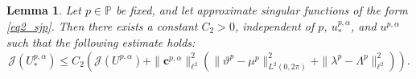 \documentclass[oneside]{article}
\newtheorem{lemma}[theorem]{Lemma}
\begin{document}
{\begin{lemma}\label{Lemma_2_2}
Let \( p \in \mathbb{P} \) be fixed, and let   approximate singular functions of the form \eqref{eq2_sjp}. 
Then there exists a constant \( C_2 > 0 \), independent of \( p \), $u_*^{p, \alpha}$, and $u^{p, \alpha}$
such that the following estimate holds:
\begin{equation}\label{eq2_Lemma2_2_equation}
{\mathcal{J}}(U_*^{p, \alpha})
\leq C_2 \left(
\mathcal{J}(U^{p, \alpha})
+  \| \mathbf{c}^{p, \alpha}\|_{\ell ^2}^2
\left(
\| \vartheta^p - \mu^p \|^2_{L^2(0, 2\pi)}
+ \| \lambda^p - \Lambda^p \|^2_{\ell^2}
\right)
\right).
\end{equation}
\end{lemma}
}

\end{document}
